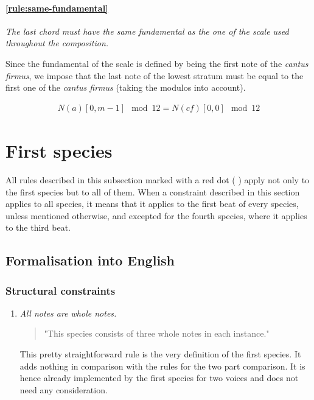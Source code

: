     \paragraph{\ref{rule:same-fundamental}} \textit{The last chord must have the same fundamental as the one of the scale used throughout the composition.}\label{constraint:same-fundamental}

    Since the fundamental of the scale is defined by being the first note of the \textit{cantus firmus}, we impose that the last note of the lowest stratum must be equal to the first one of the \textit{cantus firmus} (taking the modulos into account).
    
    
    \begin{equation} \begin{aligned}
    N(a)[0, m-1] \mod 12 = N(cf)[0, 0] \mod 12
    \end{aligned} \end{equation}

\section{First species}
All rules described in this subsection marked with a red dot ( \reddot) apply not only to the first species but to all of them. When a constraint described in this section applies to all species, it means that it applies to the first beat of every species, unless mentioned otherwise, and excepted for the fourth species, where it applies to the third beat.

\subsection{Formalisation into English}
\subsubsection{Structural constraints}
\begin{enumerate}[wide, label=\bfseries 1.S\arabic*]
    \item\label{rule:allwhole} \textit{All notes are whole notes.}
     
    \begin{quotation}
       "This species consists of three whole notes in each instance."
       \textcite[p.71]{GaPEng}
   \end{quotation}

   This pretty straightforward rule is the very definition of the first species. It adds nothing in comparison with the rules for the two part comparison. It is hence already implemented by the first species for two voices and does not need any consideration. 
\end{enumerate}
